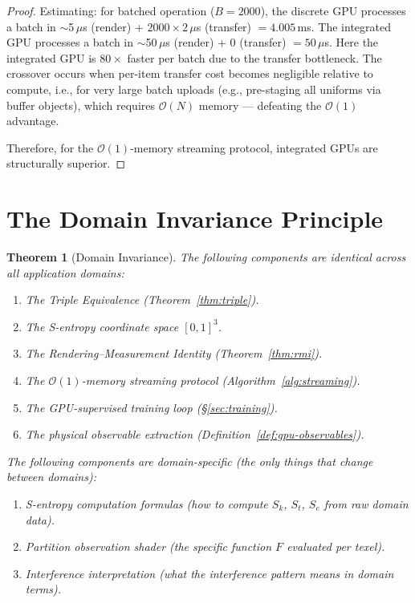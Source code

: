 \documentclass[11pt,twocolumn,a4paper]{article}
\newtheorem{theorem}{Theorem}[section]
\newcommand{\Sk}{S_k}
\newcommand{\St}{S_t}
\newcommand{\Se}{S_e}
\newcommand{\BigO}{\mathcal{O}}
\begin{document}
\begin{proof}
Estimating: for batched operation ($B = 2000$), the discrete GPU
processes a batch in $\sim$5\,$\mu$s (render) + $2000 \times 2\,\mu$s
(transfer) $= 4.005$\,ms. The integrated GPU processes a batch in
$\sim$50\,$\mu$s (render) + 0 (transfer) $= 50\,\mu$s. Here the
integrated GPU is $80\times$ faster per batch due to the transfer
bottleneck. The crossover occurs when per-item transfer cost becomes
negligible relative to compute, i.e., for very large batch uploads
(e.g., pre-staging all uniforms via buffer objects), which requires
$\BigO(N)$ memory --- defeating the $\BigO(1)$ advantage.

Therefore, for the $\BigO(1)$-memory streaming protocol, integrated
GPUs are structurally superior. \qedhere
\end{proof}



\section{The Domain Invariance Principle}
\label{sec:domain-invariance}

\begin{theorem}[Domain Invariance]
\label{thm:domain-invariance}
The following components are identical across all application domains:
\begin{enumerate}[label=(\roman*),leftmargin=*]
\item The Triple Equivalence (Theorem~\ref{thm:triple}).
\item The S-entropy coordinate space $[0,1]^3$.
\item The Rendering--Measurement Identity (Theorem~\ref{thm:rmi}).
\item The $\BigO(1)$-memory streaming protocol
  (Algorithm~\ref{alg:streaming}).
\item The GPU-supervised training loop (\S\ref{sec:training}).
\item The physical observable extraction
  (Definition~\ref{def:gpu-observables}).
\end{enumerate}
The following components are domain-specific (the only things
that change between domains):
\begin{enumerate}[label=(\alph*)]
\item S-entropy computation formulas (how to compute $\Sk$, $\St$,
  $\Se$ from raw domain data).
\item Partition observation shader (the specific function $F$
  evaluated per texel).
\item Interference interpretation (what the interference pattern
  means in domain terms).
\end{enumerate}
\end{theorem}
\end{document}
